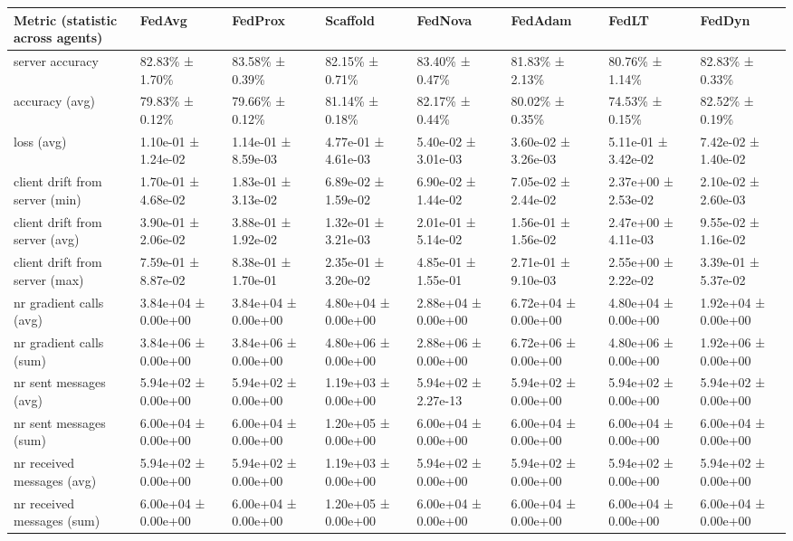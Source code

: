 \begin{tabular}{llllllll}
\hline
 Metric (statistic across agents)   & FedAvg              & FedProx             & Scaffold            & FedNova             & FedAdam             & FedLT               & FedDyn              \\
\hline
 server accuracy                    & 82.83\% ± 1.70\%      & 83.58\% ± 0.39\%      & 82.15\% ± 0.71\%      & 83.40\% ± 0.47\%      & 81.83\% ± 2.13\%      & 80.76\% ± 1.14\%      & 82.83\% ± 0.33\%      \\
 accuracy (avg)                     & 79.83\% ± 0.12\%      & 79.66\% ± 0.12\%      & 81.14\% ± 0.18\%      & 82.17\% ± 0.44\%      & 80.02\% ± 0.35\%      & 74.53\% ± 0.15\%      & 82.52\% ± 0.19\%      \\
 loss (avg)                         & 1.10e-01 ± 1.24e-02 & 1.14e-01 ± 8.59e-03 & 4.77e-01 ± 4.61e-03 & 5.40e-02 ± 3.01e-03 & 3.60e-02 ± 3.26e-03 & 5.11e-01 ± 3.42e-02 & 7.42e-02 ± 1.40e-02 \\
 client drift from server (min)     & 1.70e-01 ± 4.68e-02 & 1.83e-01 ± 3.13e-02 & 6.89e-02 ± 1.59e-02 & 6.90e-02 ± 1.44e-02 & 7.05e-02 ± 2.44e-02 & 2.37e+00 ± 2.53e-02 & 2.10e-02 ± 2.60e-03 \\
 client drift from server (avg)     & 3.90e-01 ± 2.06e-02 & 3.88e-01 ± 1.92e-02 & 1.32e-01 ± 3.21e-03 & 2.01e-01 ± 5.14e-02 & 1.56e-01 ± 1.56e-02 & 2.47e+00 ± 4.11e-03 & 9.55e-02 ± 1.16e-02 \\
 client drift from server (max)     & 7.59e-01 ± 8.87e-02 & 8.38e-01 ± 1.70e-01 & 2.35e-01 ± 3.20e-02 & 4.85e-01 ± 1.55e-01 & 2.71e-01 ± 9.10e-03 & 2.55e+00 ± 2.22e-02 & 3.39e-01 ± 5.37e-02 \\
 nr gradient calls (avg)            & 3.84e+04 ± 0.00e+00 & 3.84e+04 ± 0.00e+00 & 4.80e+04 ± 0.00e+00 & 2.88e+04 ± 0.00e+00 & 6.72e+04 ± 0.00e+00 & 4.80e+04 ± 0.00e+00 & 1.92e+04 ± 0.00e+00 \\
 nr gradient calls (sum)            & 3.84e+06 ± 0.00e+00 & 3.84e+06 ± 0.00e+00 & 4.80e+06 ± 0.00e+00 & 2.88e+06 ± 0.00e+00 & 6.72e+06 ± 0.00e+00 & 4.80e+06 ± 0.00e+00 & 1.92e+06 ± 0.00e+00 \\
 nr sent messages (avg)             & 5.94e+02 ± 0.00e+00 & 5.94e+02 ± 0.00e+00 & 1.19e+03 ± 0.00e+00 & 5.94e+02 ± 2.27e-13 & 5.94e+02 ± 0.00e+00 & 5.94e+02 ± 0.00e+00 & 5.94e+02 ± 0.00e+00 \\
 nr sent messages (sum)             & 6.00e+04 ± 0.00e+00 & 6.00e+04 ± 0.00e+00 & 1.20e+05 ± 0.00e+00 & 6.00e+04 ± 0.00e+00 & 6.00e+04 ± 0.00e+00 & 6.00e+04 ± 0.00e+00 & 6.00e+04 ± 0.00e+00 \\
 nr received messages (avg)         & 5.94e+02 ± 0.00e+00 & 5.94e+02 ± 0.00e+00 & 1.19e+03 ± 0.00e+00 & 5.94e+02 ± 0.00e+00 & 5.94e+02 ± 0.00e+00 & 5.94e+02 ± 0.00e+00 & 5.94e+02 ± 0.00e+00 \\
 nr received messages (sum)         & 6.00e+04 ± 0.00e+00 & 6.00e+04 ± 0.00e+00 & 1.20e+05 ± 0.00e+00 & 6.00e+04 ± 0.00e+00 & 6.00e+04 ± 0.00e+00 & 6.00e+04 ± 0.00e+00 & 6.00e+04 ± 0.00e+00 \\
\hline
\end{tabular}